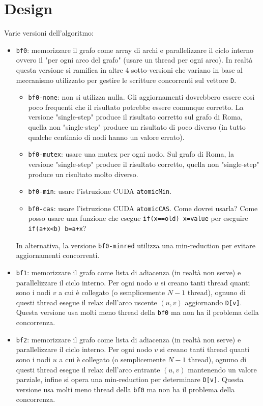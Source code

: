\documentclass{article}
\begin{document}
	\section{Design}
	\label{section:design}
	Varie versioni dell'algoritmo:
	\begin{itemize}
		\item \texttt{bf0}: memorizzare il grafo come array di archi e parallelizzare il ciclo interno ovvero il "per ogni arco del grafo" (usare un thread per ogni arco). In realtà questa versione si ramifica in altre 4 sotto-versioni che variano in base al meccanismo utilizzato per gestire le scritture concorrenti sul vettore \texttt{D}.
		\begin{itemize}
			\item \texttt{bf0-none}: non si utilizza nulla. Gli aggiornamenti dovrebbero essere così poco frequenti che il risultato potrebbe essere comunque corretto. La versione "single-step" produce il risultato corretto sul grafo di Roma, quella non "single-step" produce un risultato di poco diverso (in tutto qualche centinaio di nodi hanno un valore errato).
			\item \texttt{bf0-mutex}: usare una mutex per ogni nodo. Sul grafo di Roma, la versione "single-step" produce il risultato corretto, quella non "single-step" produce un risultato molto diverso.
			\item \texttt{bf0-min}: usare l'istruzione CUDA \texttt{atomicMin}.
			\item \texttt{bf0-cas}: usare l'istruzione CUDA \texttt{atomicCAS}. Come dovrei usarla? Come posso usare una funzione che esegue \verb|if(x==old) x=value| per eseguire \verb|if(a+x<b) b=a+x|?
		\end{itemize}
		In alternativa, la versione \texttt{bf0-minred} utilizza una min-reduction per evitare aggiornamenti concorrenti.
	
		\item \texttt{bf1}: memorizzare il grafo come lista di adiacenza (in realtà non serve) e parallelizzare il ciclo interno. Per ogni nodo $u$ si creano tanti thread quanti sono i nodi $v$ a cui è collegato (o semplicemente $N-1$ thread), ognuno di questi thread esegue il relax dell'arco uscente $(u,v)$ aggiornando \texttt{D[v]}. Questa versione usa molti meno thread della \texttt{bf0} ma non ha il problema della concorrenza.
		
		\item \texttt{bf2}: memorizzare il grafo come lista di adiacenza (in realtà non serve) e parallelizzare il ciclo interno. Per ogni nodo $v$ si creano tanti thread quanti sono i nodi $u$ a cui è collegato (o semplicemente $N-1$ thread), ognuno di questi thread esegue il relax dell'arco entrante $(u,v)$ mantenendo un valore parziale, infine si opera una min-reduction per determinare \texttt{D[v]}. Questa versione usa molti meno thread della \texttt{bf0} ma non ha il problema della concorrenza.
	\end{itemize}
\end{document}
